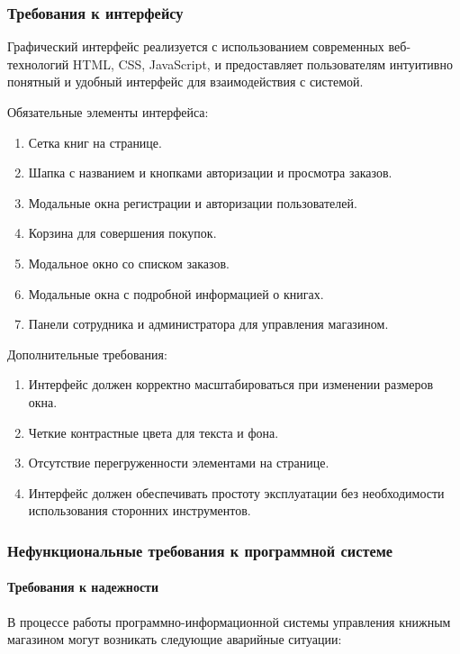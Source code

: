 \subsubsection{Требования к интерфейсу}

Графический интерфейс реализуется с использованием современных веб-технологий HTML, CSS, JavaScript, и предоставляет пользователям интуитивно понятный и удобный интерфейс для взаимодействия с системой. 

Обязательные элементы интерфейса:
\begin{enumerate}
	\item Сетка книг на странице.
	\item Шапка с названием и кнопками авторизации и просмотра заказов.		
	\item Модальные окна регистрации и авторизации пользователей.	
	\item Корзина для совершения покупок.	
	\item Модальное окно со списком заказов.
	\item Модальные окна с подробной информацией о книгах.
	\item Панели сотрудника и администратора для управления магазином.
\end{enumerate}
Дополнительные требования:
\begin{enumerate}
	\item Интерфейс должен корректно масштабироваться при изменении размеров окна.	
	\item Четкие контрастные цвета для текста и фона.
	\item Отсутствие перегруженности элементами на странице.
	\item Интерфейс должен обеспечивать простоту эксплуатации без необходимости использования сторонних инструментов.
\end{enumerate}

\subsubsection{Нефункциональные требования к программной системе}

\paragraph{Требования к надежности}

В процессе работы программно-информационной системы управления книжным магазином могут возникать следующие аварийные ситуации:

